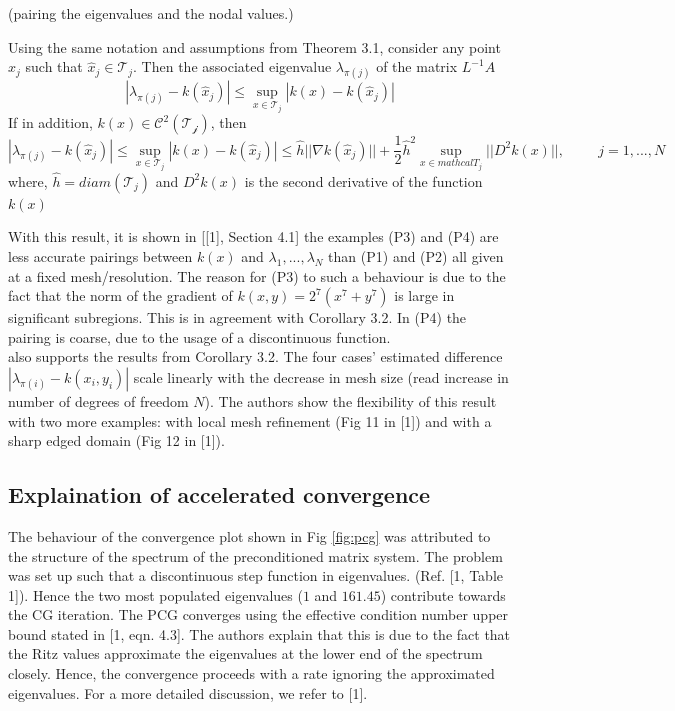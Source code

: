 \begin{corollary}{(pairing the eigenvalues and the nodal values.)}
  \label{cor:32}
  
  Using the same notation and assumptions from Theorem 3.1, consider any point $\hat{x}_j$ such that $\hat{x}_j \in \mathcal{T}_j$. Then the associated eigenvalue $\lambda_{\pi(j)}$ of the matrix $L^{-1}A$ 
  $$|\lambda_{\pi(j)}-k(\hat{x}_j)| \leq \sup_{x \in \mathcal{T}_j}|k(x) - k(\hat{x}_j)|$$
  If in addition, $k(x) \in \mathcal{C}^{2}(\mathcal{T_{j}})$, then
  $$|\lambda_{\pi(j)}-k(\hat{x}_{j})|\leq \sup_{x \in \mathcal{T}_{j}}|k(x)-k(\hat{x}_{j})| \leq \hat{h}||\nabla k(\hat{x}_{j})|| + \frac{1}{2}\hat{h}^{2}\sup_{x \in mathcal{T}_{j}}||D^{2}k(x)||, \hspace{1cm} j=1,...,N$$
  where, $\hat{h}=diam(\mathcal{T}_{j})$ and $D^{2}k(x)$ is the second derivative of the function $k(x)$
\end{corollary}
With this result, it is shown in [[1], Section 4.1] the examples (P3) and (P4) are less accurate  pairings between $k(x)$ and $\lambda_{1},...,\lambda_{N}$ than (P1) and (P2) all given at a fixed mesh/resolution. The reason for (P3) to such a behaviour is due to the fact that the norm of the gradient of $k(x,y)=2^{7}(x^{7}+y^{7})$ is large in significant subregions. This is in agreement with Corollary 3.2. In (P4) the pairing is coarse, due to the usage of a discontinuous function. \\
\cite[][Section 4.2]{gergelits2019laplacian} also supports the results from Corollary 3.2. The four cases' estimated difference $|\lambda_{\pi(i)}-k(x_{i},y_{i})|$ scale linearly with the decrease in mesh size (read increase in number of degrees of freedom $N$). The authors show the flexibility of this result with two more examples: with local mesh refinement (Fig 11 in [1]) and with a sharp edged domain (Fig 12 in [1]). \cite[][Section 4.3]{gergelits2019laplacian}

\subsection{Explaination of accelerated convergence}
The behaviour of the convergence plot shown in Fig \ref{fig:pcg} was attributed to the structure of the spectrum of the preconditioned matrix system. The problem was set up such that a discontinuous step function in eigenvalues. (Ref. [1, Table 1]). Hence the two most populated eigenvalues ($1$ and $161.45$) contribute towards the CG iteration. The PCG converges using the effective condition number upper bound stated in [1, eqn. 4.3]. The authors explain that this is due to the fact that the Ritz values approximate the eigenvalues at the lower end of the spectrum closely. Hence, the convergence proceeds with a rate ignoring the approximated eigenvalues.
For a more detailed discussion, we refer to [1].

